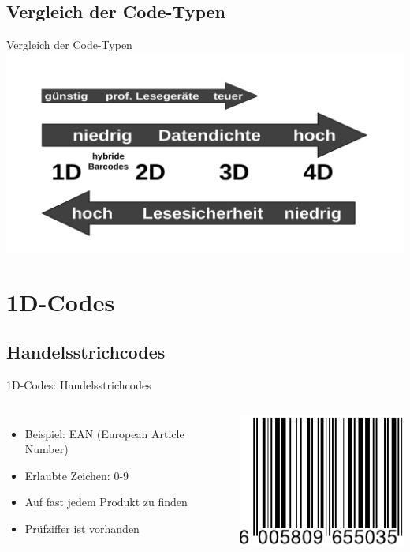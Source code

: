 \subsection{Vergleich der Code-Typen}
\begin{frame}{Vergleich der Code-Typen}
	\hfill\includegraphics[width=.95\textwidth]{muzy/vergleich.pdf}\hfill\hbox{}
\end{frame}

\section{1D-Codes}

\subsection{Handelsstrichcodes}

\begin{frame}{1D-Codes: Handelsstrichcodes}
	\begin{columns}
		\begin{itemize}
		\item Beispiel: EAN (European Article Number)
		\item Erlaubte Zeichen: 0-9
		\item Auf fast jedem Produkt zu finden
		\item Prüfziffer ist vorhanden
		\end{itemize}
		\includegraphics[width=\textwidth]{muzy/1d-ean.pdf}
	\end{columns}
\end{frame}


